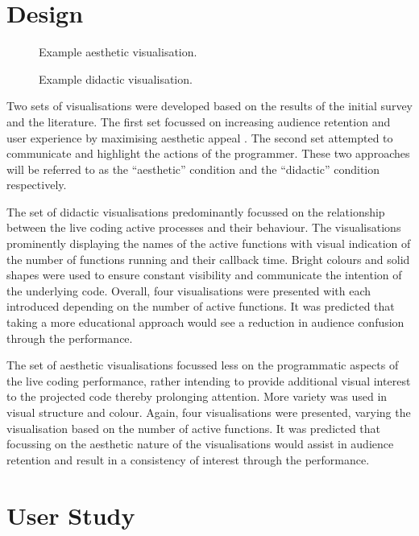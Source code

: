 \documentclass{sig-alternate}
\begin{document}
\section{Design}

\begin{figure}
\centering
{}
\caption{Example aesthetic visualisation.}
\label{fig:aesthetic-visualisation}
\end{figure}

\begin{figure}
\centering
{}
\caption{Example didactic visualisation.}
\label{fig:didactic-visualisation}
\end{figure}

Two sets of visualisations were developed based on the results of the initial survey and the literature. The first set focussed on increasing audience retention and user experience by maximising aesthetic appeal \cite{Cawthon2007}. The second set attempted to communicate and highlight the actions of the programmer. These two approaches will be referred to as the ``aesthetic'' condition and the ``didactic'' condition respectively.

The set of didactic visualisations predominantly focussed on the relationship between the live coding active processes and their behaviour. The visualisations prominently displaying the names of the active functions with visual indication of the number of functions running and their callback time. Bright colours and solid shapes were used to ensure constant visibility and communicate the intention of the underlying code. Overall, four visualisations were presented with each introduced depending on the number of active functions. It was predicted that taking a more educational approach would see a reduction in audience confusion through the performance.

The set of aesthetic visualisations focussed less on the programmatic aspects of the live coding performance, rather intending to provide additional visual interest to the projected code thereby prolonging attention. More variety was used in visual structure and colour. Again, four visualisations were presented, varying the visualisation based on the number of active functions. It was predicted that focussing on the aesthetic nature of the visualisations would assist in audience retention and result in a consistency of interest through the performance.

\section{User Study}
\end{document}
